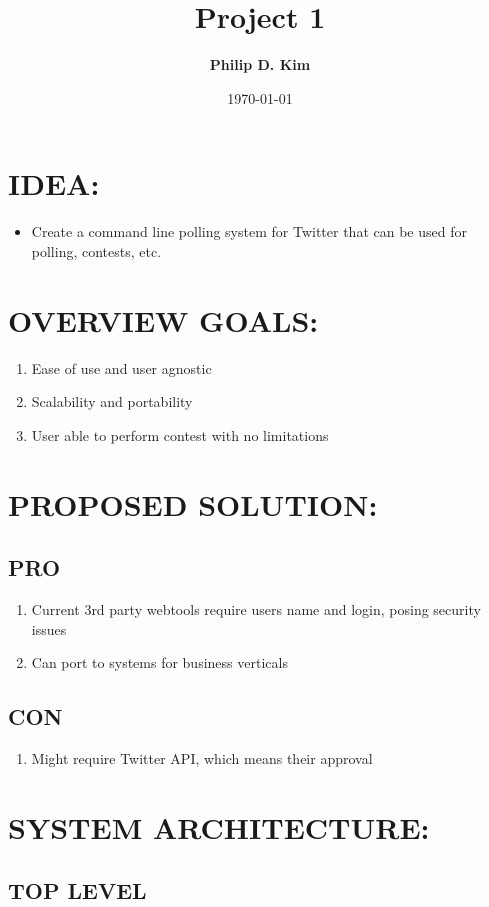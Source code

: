 \documentclass{article}
\title{\Huge\textbf{Project 1}}
\author{\textbf{Philip D. Kim}}
\date{\today}
\begin{document}
  \maketitle
  \section*{\textbf{IDEA:}}
  \begin{itemize}
    \item[] Create a command line polling system for Twitter that can be used for polling, contests, etc.
  \end{itemize}
  \section*{\textbf{OVERVIEW GOALS:}}
  \begin{enumerate}
    \item Ease of use and user agnostic
    \item Scalability and portability
    \item User able to perform contest with no limitations
  \end{enumerate}
  \section*{\textbf{PROPOSED SOLUTION:}}
  \subsection*{PRO}
  \begin{enumerate}
    \item Current 3rd party webtools require users name and login, posing security issues
    \item Can port to systems for business verticals
  \end{enumerate}
  \subsection*{CON}
  \begin{enumerate}
    \item Might require Twitter API, which means their approval
  \end{enumerate}
  \clearpage
  \section*{\textbf{SYSTEM ARCHITECTURE:}}
  \subsection*{TOP LEVEL}
  \begin{center}
  \end{center}
\end{document}
